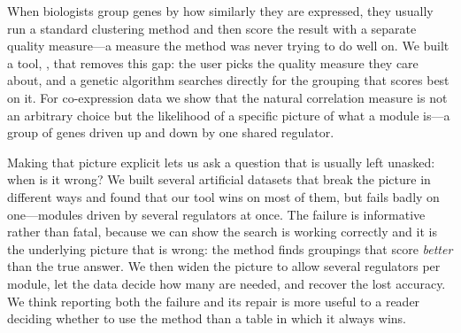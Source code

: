 When biologists group genes by how similarly they are expressed, they usually run
a standard clustering method and then score the result with a separate quality
measure---a measure the method was never trying to do well on. We built a tool,
\tool{}, that removes this gap: the user picks the quality measure they care
about, and a genetic algorithm searches directly for the grouping that scores
best on it. For co-expression data we show that the natural correlation measure
is not an arbitrary choice but the likelihood of a specific picture of what a
module is---a group of genes driven up and down by one shared regulator.

Making that picture explicit lets us ask a question that is usually left
unasked: when is it wrong? We built several artificial datasets that break the
picture in different ways and found that our tool wins on most of them, but fails
badly on one---modules driven by several regulators at once. The failure is
informative rather than fatal, because we can show the search is working
correctly and it is the underlying picture that is wrong: the method finds
groupings that score \emph{better} than the true answer. We then widen the
picture to allow several regulators per module, let the data decide how many are
needed, and recover the lost accuracy. We think reporting both the failure and
its repair is more useful to a reader deciding whether to use the method than a
table in which it always wins.
